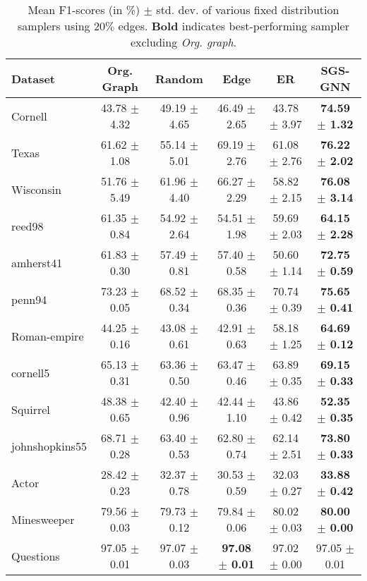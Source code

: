 \begin{table}[t]
\caption{Mean F1-scores (in \%) $\pm$ std. dev. of various fixed distribution samplers using $20\%$ edges. \textbf{Bold} indicates best-performing sampler excluding \textit{Org. graph}.}
\label{tab:hetero_homo_graphs}
\centering
\begin{sc}
\resizebox{1.0\linewidth}{!}
{
\def\arraystretch{1.0}
\begin{tabular}{@{}l|c|cccc@{}}
\toprule
\textbf{Dataset} & \textbf{Org. Graph}     & \textbf{Random}   & \textbf{Edge}              & 
\textbf{ER} & \textbf{SGS-GNN}           \\\midrule
Cornell & 43.78 $\pm$ 4.32 & 49.19 $\pm$ 4.65 & 46.49 $\pm$ 2.65 & 43.78 $\pm$ 3.97 & \textbf{74.59 $\pm$ 1.32} \\
Texas & 61.62 $\pm$ 1.08 & 55.14 $\pm$ 5.01 & 69.19 $\pm$ 2.76 & 61.08 $\pm$ 2.76 & \textbf{76.22 $\pm$ 2.02} \\
Wisconsin & 51.76 $\pm$ 5.49 & 61.96 $\pm$ 4.40 & 66.27 $\pm$ 2.29 & 58.82 $\pm$ 2.15 & \textbf{76.08 $\pm$ 3.14} \\
reed98 & 61.35 $\pm$ 0.84 & 54.92 $\pm$ 2.64 & 54.51 $\pm$ 1.98 & 59.69 $\pm$ 2.03 & \textbf{64.15 $\pm$ 2.28} \\
amherst41 & 61.83 $\pm$ 0.30 & 57.49 $\pm$ 0.81 & 57.40 $\pm$ 0.58 & 50.60 $\pm$ 1.14 & \textbf{72.75 $\pm$ 0.59} \\
penn94 & 73.23 $\pm$ 0.05 & 68.52 $\pm$ 0.34 & 68.35 $\pm$ 0.36 & 70.74 $\pm$ 0.39 & \textbf{75.65 $\pm$ 0.41} \\
Roman-empire & 44.25 $\pm$ 0.16 & 43.08 $\pm$ 0.61 & 42.91 $\pm$ 0.63 & 58.18 $\pm$ 1.25 & \textbf{64.69 $\pm$ 0.12} \\
cornell5 & 65.13 $\pm$ 0.31 & 63.36 $\pm$ 0.50 & 63.47 $\pm$ 0.46 & 63.89 $\pm$ 0.35 & \textbf{69.15 $\pm$ 0.33} \\
Squirrel & 48.38 $\pm$ 0.65 & 42.40 $\pm$ 0.96 & 42.44 $\pm$ 1.10 & 43.86 $\pm$ 0.42 & \textbf{52.35 $\pm$ 0.35} \\
johnshopkins55 & 68.71 $\pm$ 0.28 & 63.40 $\pm$ 0.53 & 62.80 $\pm$ 0.74 & 62.14 $\pm$ 2.51 & \textbf{73.80 $\pm$ 0.33} \\
Actor & 28.42 $\pm$ 0.23 & 32.37 $\pm$ 0.78 & 30.53 $\pm$ 0.59 & 32.03 $\pm$ 0.27 & \textbf{33.88 $\pm$ 0.42} \\
Minesweeper & 79.56 $\pm$ 0.03 & 79.73 $\pm$ 0.12 & 79.84 $\pm$ 0.06 & 80.02 $\pm$ 0.03 & \textbf{80.00 $\pm$ 0.00} \\
Questions & 97.05 $\pm$ 0.01 & 97.07 $\pm$ 0.03 & \textbf{97.08 $\pm$ 0.01} & 97.02 $\pm$ 0.00 & 97.05 $\pm$ 0.01 \\

\end{tabular}}
\end{sc}
\end{table}
